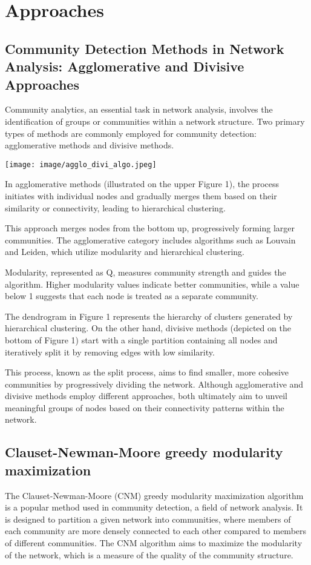 \section{Approaches}

\subsection{Community Detection Methods in Network Analysis: Agglomerative and Divisive Approaches}
Community analytics, an essential task in network analysis, involves the identification of groups or communities within a network structure. Two primary types of methods are commonly employed for community detection: agglomerative methods and divisive methods.
\begin{center}
    \texttt{[image: image/agglo\_divi\_algo.jpeg]}
\end{center}
In agglomerative methods (illustrated on the upper Figure 1), the process initiates with individual nodes and gradually merges them based on their similarity or connectivity, leading to hierarchical clustering. 

This approach merges nodes from the bottom up, progressively forming larger communities. The agglomerative category includes algorithms such as Louvain and Leiden, which utilize modularity and hierarchical clustering. 

Modularity, represented as Q, measures community strength and guides the algorithm. Higher modularity values indicate better communities, while a value below 1 suggests that each node is treated as a separate community. 

The dendrogram in Figure 1 represents the hierarchy of clusters generated by hierarchical clustering. On the other hand, divisive methods (depicted on the bottom of Figure 1) start with a single partition containing all nodes and iteratively split it by removing edges with low similarity. 

This process, known as the split process, aims to find smaller, more cohesive communities by progressively dividing the network. Although agglomerative and divisive methods employ different approaches, both ultimately aim to unveil meaningful groups of nodes based on their connectivity patterns within the network.

\subsection{Clauset-Newman-Moore greedy modularity maximization}
The Clauset-Newman-Moore (CNM) greedy modularity maximization algorithm is a popular method used in community detection, a field of network analysis. It is designed to partition a given network into communities, where members of each community are more densely connected to each other compared to members of different communities. The CNM algorithm aims to maximize the modularity of the network, which is a measure of the quality of the community structure.

